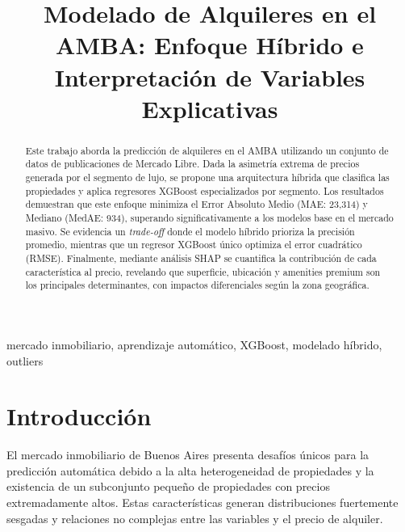 \documentclass[conference]{IEEEtran}
\begin{document}
    \title{Modelado de Alquileres en el AMBA: Enfoque Híbrido e Interpretación de Variables Explicativas}

    \author{
    \and
    }

    \maketitle

    \begin{abstract}
        \noindent
        Este trabajo aborda la predicción de alquileres en el AMBA utilizando un conjunto de datos de publicaciones de Mercado Libre. Dada la asimetría extrema de precios generada por el segmento de lujo, se propone una arquitectura híbrida que clasifica las propiedades y aplica regresores XGBoost especializados por segmento. Los resultados demuestran que este enfoque minimiza el Error Absoluto Medio (MAE: 23,314) y Mediano (MedAE: 934), superando significativamente a los modelos base en el mercado masivo. Se evidencia un \emph{trade-off} donde el modelo híbrido prioriza la precisión promedio, mientras que un regresor XGBoost único optimiza el error cuadrático (RMSE). Finalmente, mediante análisis SHAP se cuantifica la contribución de cada característica al precio, revelando que superficie, ubicación y amenities premium son los principales determinantes, con impactos diferenciales según la zona geográfica.
    \end{abstract}

    \begin{IEEEkeywords}
        mercado inmobiliario, aprendizaje automático, XGBoost, modelado híbrido, outliers
    \end{IEEEkeywords}

    \section{Introducción}
    El mercado inmobiliario de Buenos Aires presenta desafíos únicos para la predicción automática debido a la alta heterogeneidad de propiedades y la existencia de un subconjunto pequeño de propiedades con precios extremadamente altos. Estas características generan distribuciones fuertemente sesgadas y relaciones no complejas entre las variables y el precio de alquiler.
\end{document}
